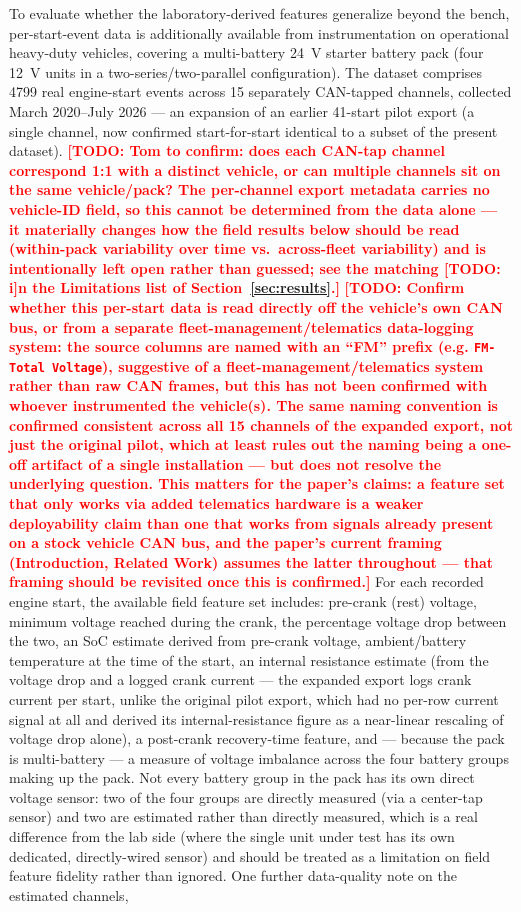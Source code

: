 \documentclass[conference]{IEEEtran}
\newcommand{\todo}[1]{\textcolor{red}{\textbf{[TODO: #1]}}}
\begin{document}
To evaluate whether the laboratory-derived features generalize beyond the bench, per-start-event data is additionally available from instrumentation on operational heavy-duty vehicles, covering a multi-battery 24~V starter battery pack (four 12~V units in a two-series/two-parallel configuration). The dataset comprises 4799 real engine-start events across 15 separately CAN-tapped channels, collected March 2020--July 2026 --- an expansion of an earlier 41-start pilot export (a single channel, now confirmed start-for-start identical to a subset of the present dataset). \todo{Tom to confirm: does each CAN-tap channel correspond 1:1 with a distinct vehicle, or can multiple channels sit on the same vehicle/pack? The per-channel export metadata carries no vehicle-ID field, so this cannot be determined from the data alone --- it materially changes how the field results below should be read (within-pack variability over time vs.\ across-fleet variability) and is intentionally left open rather than guessed; see the matching \todo in the Limitations list of Section~\ref{sec:results}.} \todo{Confirm whether this per-start data is read directly off the vehicle's own CAN bus, or from a separate fleet-management/telematics data-logging system: the source columns are named with an ``FM'' prefix (e.g. \texttt{FM-Total Voltage}), suggestive of a fleet-management/telematics system rather than raw CAN frames, but this has not been confirmed with whoever instrumented the vehicle(s). The same naming convention is confirmed consistent across all 15 channels of the expanded export, not just the original pilot, which at least rules out the naming being a one-off artifact of a single installation --- but does not resolve the underlying question. This matters for the paper's claims: a feature set that only works via added telematics hardware is a weaker deployability claim than one that works from signals already present on a stock vehicle CAN bus, and the paper's current framing (Introduction, Related Work) assumes the latter throughout --- that framing should be revisited once this is confirmed.} For each recorded engine start, the available field feature set includes: pre-crank (rest) voltage, minimum voltage reached during the crank, the percentage voltage drop between the two, an SoC estimate derived from pre-crank voltage, ambient/battery temperature at the time of the start, an internal resistance estimate (from the voltage drop and a logged crank current --- the expanded export logs crank current per start, unlike the original pilot export, which had no per-row current signal at all and derived its internal-resistance figure as a near-linear rescaling of voltage drop alone), a post-crank recovery-time feature, and --- because the pack is multi-battery --- a measure of voltage imbalance across the four battery groups making up the pack. Not every battery group in the pack has its own direct voltage sensor: two of the four groups are directly measured (via a center-tap sensor) and two are estimated rather than directly measured, which is a real difference from the lab side (where the single unit under test has its own dedicated, directly-wired sensor) and should be treated as a limitation on field feature fidelity rather than ignored. One further data-quality note on the estimated channels, 
\end{document}

